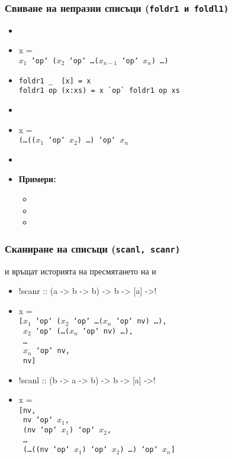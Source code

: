 \documentclass[alsotrans]{beamerswitch}
\begin{document}
\begin{frame}[fragile]
  \frametitle{Свиване на непразни списъци (\tt{foldr1} и \tt{foldl1})}

  \begin{itemize}[<+->]
  \item {}
  \item {}\hlist x = \\
    $x_1$\tt{ `op` (}$x_2$\tt{ `op` }\ldots \tt($x_{n-1}$\tt{ `op` }$x_n$\tt) \ldots\tt)
  \item
\begin{lstlisting}
foldr1 _  [x] = x
foldr1 op (x:xs) = x `op` foldr1 op xs
\end{lstlisting}
  \item {}
  \item {}\hlist x = \\
    \tt(\ldots\tt{((}$x_1$\tt{ `op` }$x_2$\tt) \ldots \tt{) `op` }$x_n$
  \item {}
  \item \textbf{Примери:}
    \begin{itemize}
    \item {}
    \item {}
    \item {}
    \end{itemize}
  \end{itemize}
\end{frame}

\begin{frame}
  \frametitle{Сканиране на списъци (\tt{scanl}, \tt{scanr})}

  \sizeboth\small
   и  връщат историята на пресмятането на  и 
  \pause
  \begin{itemize}[<+->]
    \setlength\itemsep{.1em}
  \item \lst!scanr :: (a -> b -> b) -> b -> [a] ->! \tta{[b]}
  \item {} \hlist x = \\
    \tt[$x_1$\tt{ `op` (}$x_2$\tt{ `op` }\ldots \tt($x_n$\tt{ `op` nv)} \ldots\tt{),}\\
    \tt{ }$x_2$\tt{ `op` (}\ldots \tt($x_n$\tt{ `op` nv)} \ldots\tt{),}\\
    \tt{ }\ldots\\
    \tt{ }$x_n$\tt{ `op` nv,}\\
    \tt{ nv]}
  \item \lst!scanl :: (b -> a -> b) -> b -> [a] ->! \tta{[b]}
  \item {} \hlist x = \\
    \tt{[nv,}\\
    \tt{ nv `op` }$x_1$\tt,\\
    \tt{ (nv `op` }$x_1$\tt{) `op` }$x_2$\tt,\\
    \tt{ }\ldots\\
    \tt{ (\ldots((nv `op` $x_1$) `op` $x_2$) \ldots ) `op` $x_n$]}
  \end{itemize}
\end{frame}
\end{document}

